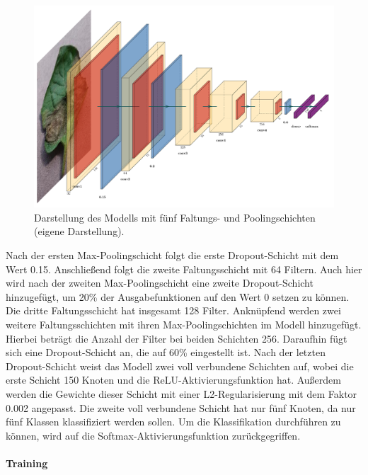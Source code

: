 \begin{figure}[h!]
	\centering
	\includegraphics[width=\textwidth]{bilder/my_arch.pdf}
	\caption{Darstellung des Modells mit fünf Faltungs- und Poolingschichten (eigene Darstellung).}
	\label{my_arch}
\end{figure} 
 
Nach der ersten Max-Poolingschicht folgt die erste Dropout-Schicht mit dem Wert 0.15. Anschließend folgt die zweite Faltungsschicht mit 64 Filtern. Auch hier wird nach der zweiten Max-Poolingschicht eine zweite Dropout-Schicht hinzugefügt, um 20\% der Ausgabefunktionen auf den Wert 0 setzen zu können. Die dritte Faltungsschicht hat insgesamt 128 Filter. Anknüpfend werden zwei weitere Faltungsschichten mit ihren Max-Poolingschichten im Modell hinzugefügt. Hierbei beträgt die Anzahl der Filter bei beiden Schichten 256. Daraufhin fügt sich eine Dropout-Schicht an, die auf 60\% eingestellt ist. Nach der letzten Dropout-Schicht weist das Modell zwei voll verbundene Schichten auf, wobei die erste Schicht 150 Knoten und die ReLU-Aktivierungsfunktion hat. Außerdem werden die Gewichte dieser Schicht mit einer L2-Regularisierung mit dem Faktor 0.002 angepasst. Die zweite voll verbundene Schicht hat nur fünf Knoten, da nur fünf Klassen klassifiziert werden sollen. Um die Klassifikation durchführen zu können, wird auf die Softmax-Aktivierungsfunktion zurückgegriffen. 




\paragraph{Training}
~\newline

